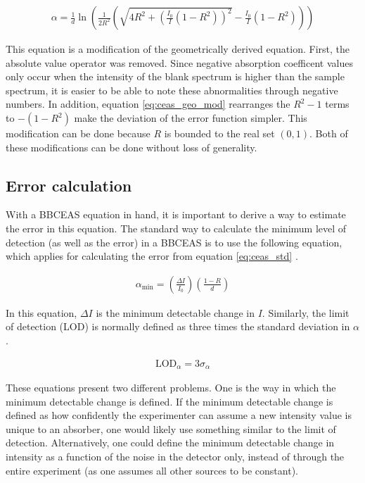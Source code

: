 \begin{align}
    \alpha = \frac{1}{d}\ln\left(\frac{1}{2R^2}\left(\sqrt{4R^2+\left(\frac{I_0}{I}(1-R^2)\right)^2} - \frac{I_0}{I}(1-R^2)\right)\right) \label{eq:ceas_geo_mod}
\end{align}

This equation is a modification of the geometrically derived equation. First,
the absolute value operator was removed. Since negative absorption coefficent
values only occur when the intensity of the blank spectrum is higher than the
sample spectrum, it is easier to be able to note these abnormalities through
negative numbers. In addition, equation \eqref{eq:ceas_geo_mod} rearranges the
$R^2-1$ terms to $-(1-R^2)$ make the deviation of the error function simpler.
This modification can be done because $R$ is bounded to the real set
$(0,1)$. Both of these modifications can be done without loss of generality.



\subsection{Error calculation}\label{subsec:ceas_error}


With a \ac{BBCEAS} equation in hand, it is important to derive a way to
estimate the error in this equation. The standard way to calculate the minimum
level of detection (as well as the error) in a \ac{BBCEAS} is to use the
following equation, which applies for calculating the error from equation
\eqref{eq:ceas_std} \cite{Mazurenka:2005fh}.

\begin{align}
  \alpha_{\text{min}} = \left(\frac{\Delta
  I}{I_0}\right)\left(\frac{1-R}{d}\right)\label{eq:ceas_min}
\end{align}

In this equation, $\Delta I$ is the minimum detectable change in $I$.
Similarly, the limit of detection (LOD) is normally defined as three times the
standard deviation in $\alpha$ \cite{Islam:2007ea}.

\begin{align}
  \text{LOD}_{\alpha} = 3\sigma_{\alpha}\label{eq:lod}
\end{align}

These equations present two different problems.  One is the way in which the
minimum detectable change is defined. If the minimum detectable change is
defined as how confidently the experimenter can assume a new intensity value is
unique to an absorber, one would likely use something similar to the limit of
detection. Alternatively, one could define the minimum detectable change in
intensity as a function of the noise in the detector only, instead of through
the entire experiment (as one assumes all other sources to be constant).

